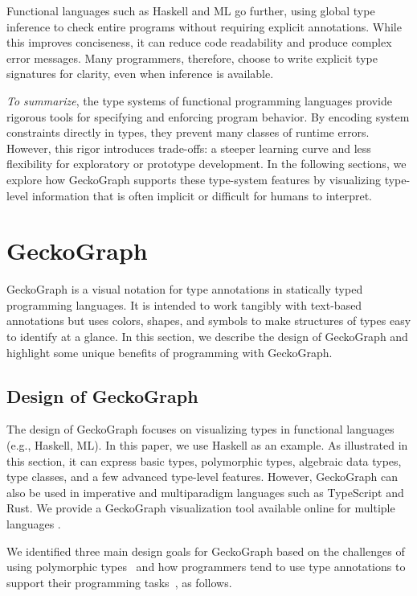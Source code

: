\documentclass[preprint,12pt]{elsarticle}
\begin{document}
Functional languages such as Haskell and ML go further, using global type inference \cite{Damas1982-zw} to check entire programs without requiring explicit annotations. While this improves conciseness, it can reduce code readability and produce complex error messages. Many programmers, therefore, choose to write explicit type signatures for clarity, even when inference is available.




{\it To summarize}, the type systems of functional programming languages provide rigorous tools for specifying and enforcing program behavior. By encoding system constraints directly in types, they prevent many classes of runtime errors. However, this rigor introduces trade-offs: a steeper learning curve and less flexibility for exploratory or prototype development. In the following sections, we explore how GeckoGraph supports these type-system features by visualizing type-level information that is often implicit or difficult for humans to interpret.


\section{GeckoGraph} \label{sec:gecko-graph}

GeckoGraph is a visual notation for type annotations in statically typed programming languages. It is intended to work tangibly with text-based annotations but uses colors, shapes, and symbols to make structures of types easy to identify at a glance. In this section, we describe the design of GeckoGraph and highlight some unique benefits of programming with GeckoGraph.

\subsection{Design of GeckoGraph}
The design of GeckoGraph focuses on visualizing types in functional languages (e.g., Haskell, ML). In this paper, we use Haskell as an example. As illustrated in this section, it can express basic types, polymorphic types, algebraic data types, type classes, and a few advanced type-level features. However, GeckoGraph can also be used in imperative and multiparadigm languages such as TypeScript and Rust. We provide a GeckoGraph visualization tool available online for multiple languages \cite{Fu2025-ka}.

We identified three main design goals for GeckoGraph based on the challenges of using polymorphic types~\cite{Jun2000-ec, Jun2000-yu} and how programmers tend to use type annotations to support their programming tasks~\cite{Justin_Lubin2021-yy}, as follows. 
\end{document}
